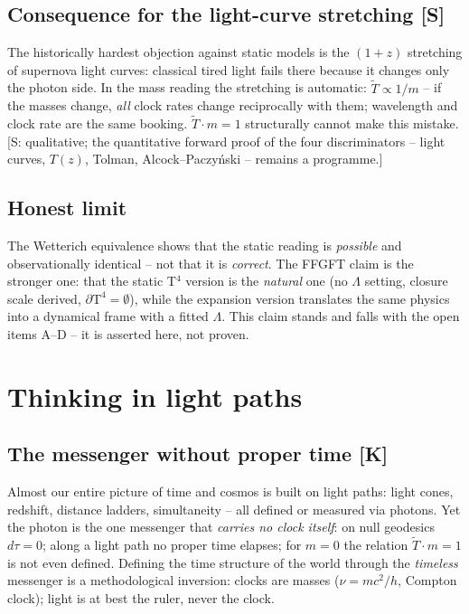 \documentclass[11pt]{report}
\begin{document}
\section{Consequence for the light-curve stretching [S]}

The historically hardest objection against static models is the
$(1+z)$ stretching of supernova light curves: classical tired
light fails there because it changes only the photon side. In the
mass reading the stretching is automatic:
$\tilde T \propto 1/m$ -- if the masses change, \emph{all} clock
rates change reciprocally with them; wavelength and clock rate are
the same booking. $\tilde T \cdot m = 1$ structurally cannot make
this mistake. [S: qualitative; the quantitative forward proof of
the four discriminators -- light curves, $T(z)$, Tolman,
Alcock--Paczyński -- remains a programme.]

\section{Honest limit}

The Wetterich equivalence shows that the static reading is
\emph{possible} and observationally identical -- not that it is
\emph{correct}. The FFGFT claim is the stronger one: that the
static T$^4$ version is the \emph{natural} one (no $\Lambda$
setting, closure scale derived, $\partial\text{T}^4 = \emptyset$),
while the expansion version translates the same physics into a
dynamical frame with a fitted $\Lambda$. This claim stands and
falls with the open items A--D -- it is asserted here, not proven.

\chapter{Thinking in light paths}

\section{The messenger without proper time [K]}

Almost our entire picture of time and cosmos is built on light
paths: light cones, redshift, distance ladders, simultaneity -- all
defined or measured via photons. Yet the photon is the one
messenger that \emph{carries no clock itself}: on null geodesics
$d\tau = 0$; along a light path no proper time elapses; for
$m = 0$ the relation $\tilde T \cdot m = 1$ is not even defined.
Defining the time structure of the world through the
\emph{timeless} messenger is a methodological inversion: clocks
are masses ($\nu = mc^2/h$, Compton clock); light is at best the
ruler, never the clock.
\end{document}
